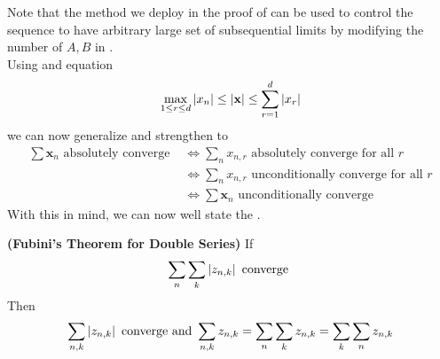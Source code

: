 \documentclass{report}
\begin{document}
\begin{mdframed}
Note that the method we deploy in the proof of  can be used to control the sequence to have arbitrary large set of subsequential limits by modifying the number of $A,B$ in  .\\

Using  and equation
\begin{align*}
\max_{1\leq r\leq d}\left|x_n\right|\leq \left|\textbf{x}\right|\leq \sum_{r=1}^d \left|x_r\right|
\end{align*}
we can now generalize and strengthen  to 
\begin{align*}
  \sum \textbf{x}_n \text{ absolutely converge }&\iff  \sum_n x_{n,r}\text{ absolutely converge for all }r\\
  &\iff \sum_n x_{n,r}\text{ unconditionally converge for all }r\\
  &\iff \sum \textbf{x}_n\text{ unconditionally converge }
\end{align*}
With this in mind, we can now well state the .
\end{mdframed}
\begin{theorem}
\label{FTfDS}
\textbf{(Fubini's Theorem for Double Series)} If 
\begin{align*}
\sum_n \sum_k \left|z_{n,k}\right|\text{ converge } 
\end{align*}
Then 
\begin{align*}
\sum_{n,k}\left|z_{n,k}\right|\text{ converge and }\sum_{n,k}z_{n,k}=\sum_n \sum_k z_{n,k} =\sum_k \sum_n z_{n,k}
\end{align*}
\end{theorem}
\end{document}
